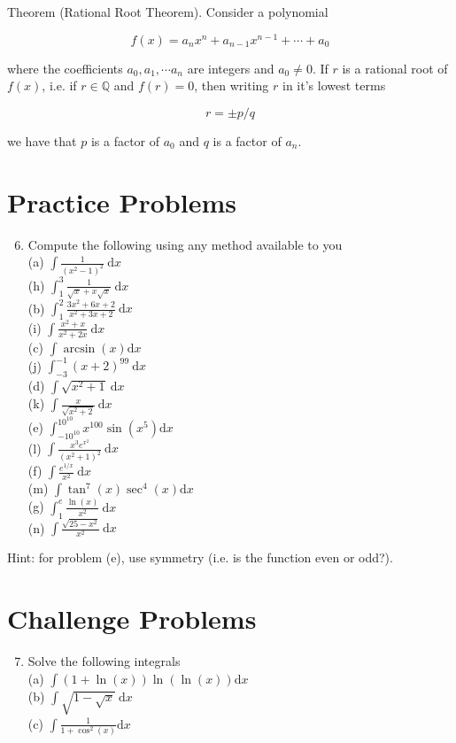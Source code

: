 \documentclass[10pt]{article}
\begin{document}
Theorem (Rational Root Theorem). Consider a polynomial

$$
f(x)=a_{n} x^{n}+a_{n-1} x^{n-1}+\cdots+a_{0}
$$

where the coefficients $a_{0}, a_{1}, \cdots a_{n}$ are integers and $a_{0} \neq 0$. If $r$ is a rational root of $f(x)$, i.e. if $r \in \mathbb{Q}$ and $f(r)=0$, then writing $r$ in it's lowest terms

$$
r= \pm p / q
$$

we have that $p$ is a factor of $a_{0}$ and $q$ is a factor of $a_{n}$.

\section*{Practice Problems}
\begin{enumerate}
  \setcounter{enumi}{5}
  \item Compute the following using any method available to you\\
(a) $\int \frac{1}{\left(x^{2}-1\right)^{2}} \mathrm{~d} x$\\
(h) $\int_{1}^{3} \frac{1}{\sqrt{x}+x \sqrt{x}} \mathrm{~d} x$\\
(b) $\int_{1}^{2} \frac{3 x^{2}+6 x+2}{x^{2}+3 x+2} \mathrm{~d} x$\\
(i) $\int \frac{x^{2}+x}{x^{2}+2 x} \mathrm{~d} x$\\
(c) $\int \arcsin (x) \mathrm{d} x$\\
(j) $\int_{-3}^{-1}(x+2)^{99} \mathrm{~d} x$\\
(d) $\int \sqrt{x^{2}+1} \mathrm{~d} x$\\
(k) $\int \frac{x}{\sqrt{x^{2}+2}} \mathrm{~d} x$\\
(e) $\int_{-10^{10}}^{10^{10}} x^{100} \sin \left(x^{5}\right) \mathrm{d} x$\\
(l) $\int \frac{x^{3} e^{x^{2}}}{\left(x^{2}+1\right)^{2}} \mathrm{~d} x$\\
(f) $\int \frac{e^{1 / x}}{x^{2}} \mathrm{~d} x$\\
(m) $\int \tan ^{7}(x) \sec ^{4}(x) \mathrm{d} x$\\
(g) $\int_{1}^{e} \frac{\ln (x)}{x^{2}} \mathrm{~d} x$\\
(n) $\int \frac{\sqrt{25-x^{2}}}{x^{2}} \mathrm{~d} x$
\end{enumerate}

Hint: for problem (e), use symmetry (i.e. is the function even or odd?).

\section*{Challenge Problems}
\begin{enumerate}
  \setcounter{enumi}{6}
  \item Solve the following integrals\\
(a) $\int(1+\ln (x)) \ln (\ln (x)) \mathrm{d} x$\\
(b) $\int \sqrt{1-\sqrt{x}} \mathrm{~d} x$\\
(c) $\int \frac{1}{1+\cos ^{2}(x)} \mathrm{d} x$
\end{enumerate}
\end{document}
